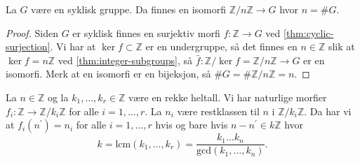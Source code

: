 \begin{corollary}
    La $G$ være en syklisk gruppe.
    Da finnes en isomorfi $\mathbb Z / n\mathbb Z\to G$
    hvor $n = \# G$.
\end{corollary}
\begin{proof}
    Siden $G$ er syklisk finnes en surjektiv morfi $f\colon \mathbb Z\to G$
    ved \cref{thm:cyclic-surjection}.
    Vi har at $\ker f\subset \mathbb Z$ er en undergruppe,
    så det finnes en $n\in \mathbb Z$ slik at
    $\ker f = n\mathbb Z$ ved \cref{thm:integer-subgroups},
    så $\bar f\colon \mathbb Z / \ker f = \mathbb Z / n\mathbb Z\to G$
    er en isomorfi.
    Merk at en isomorfi er en bijeksjon, så $\# G = \# \mathbb Z / n\mathbb Z = n$.
\end{proof}

\begin{theorem}
    La $n\in \mathbb Z$ og la $k_1,\dots, k_r\in \mathbb Z$ være en rekke heltall.
    Vi har naturlige morfier $f_i\colon \mathbb Z\to \mathbb Z / k_i\mathbb Z$
    for alle $i=1,\dots,r$.
    La $n_i$ være restklassen til $n$ i $\mathbb Z / k_i\mathbb Z$.
    Da har vi at $f_i(n^\prime) = n_i$ for alle $i=1,\dots,r$
    hvis og bare hvis $n - n^\prime\in k\mathbb Z$ hvor
    \[
        k
        = \mathrm{lcm}(k_1,\dots,k_r)
        = \frac {k_1\dots k_n}{\mathrm{gcd}(k_1,\dots,k_n)}.
    \]
\end{theorem}

